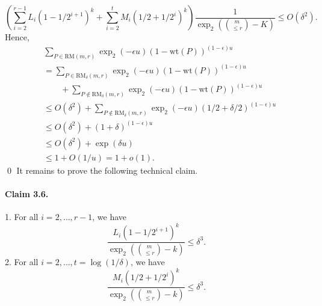 \documentclass[10pt,a4paper]{article}
\begin{document}
\[\left(\sum_{i=2}^{r-1}L_i(1-1/2^{i+1})^k+\sum_{i=2}^tM_i(1/2+1/2^i)^k\right)\frac1{\operatorname{exp}_2\left(\binom m{\le r}-K\right)}\le O(\delta^2).\]
Hence,
\begin{align*}&\sum_{P\in\mathrm{RM}(m,r)}\operatorname{exp}_2(-\epsilon u)(1-\mathrm{wt}(P))^{(1-\epsilon)u}\\&=\sum_{P\in\mathrm{RM}_\delta(m,r)}\operatorname{exp}_2(-\epsilon u)(1-\mathrm{wt}(P))^{(1-\epsilon)u}\\&\qquad+\sum_{P\notin\mathrm{RM}_\delta(m,r)}\operatorname{exp}_2(-\epsilon u)(1-\mathrm{wt}(P))^{(1-\epsilon)u}\\&\le O(\delta^2)+\sum_{P\notin\mathrm{RM}_\delta(m,r)}\operatorname{exp}_2(-\epsilon u)(1/2+\delta/2)^{(1-\epsilon)u}\\&\le O(\delta^2)+(1+\delta)^{(1-\epsilon)u}\\&\le O(\delta^2)+\exp(\delta u)\\&\le1+O(1/u)=1+o(1).\end{align*}\qed
It remains to prove the following technical claim.
\paragraph{Claim 3.6.} 1. For all $i=2,\ldots,r-1$, we have
\[\frac{L_i(1-1/2^{i+1})^k}{\operatorname{exp}_2\left(\binom m{\le r}-k\right)}\le\delta^3.\]
2. For all $i=2,\ldots,t=\log(1/\delta)$, we have
\[\frac{M_i(1/2+1/2^i)^k}{\operatorname{exp}_2\left(\binom m{\le r}-k\right)}\le\delta^3.\]
\end{document}
